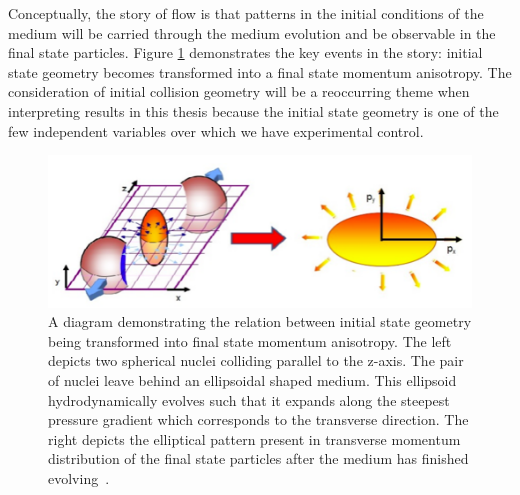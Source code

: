 Conceptually, the story of flow is that patterns in the initial conditions of the medium will be carried through the medium evolution and be observable in the final state particles. Figure \ref{fig:standard_flow_diagram} demonstrates the key events in the story: initial state geometry becomes transformed into a final state momentum anisotropy. The consideration of initial collision geometry will be a reoccurring theme when interpreting results in this thesis because the initial state geometry is one of the few independent variables over which we have experimental control.

\begin{figure}[!ht]
\begin{center}
\includegraphics[width=0.55\linewidth]{figs/elliptical_flow_cartoon.png}
\caption{A diagram demonstrating the relation between initial state geometry being transformed into final state momentum anisotropy. The left depicts two spherical nuclei colliding parallel to the z-axis. The pair of nuclei leave behind an ellipsoidal shaped medium. This ellipsoid hydrodynamically evolves such that it expands along the steepest pressure gradient which corresponds to the transverse direction. The right depicts the elliptical pattern present in transverse momentum distribution of the final state particles after the medium has finished evolving~\cite{PhysRevLett.110.012302}.}
\label{fig:standard_flow_diagram}
\end{center}
\end{figure}

